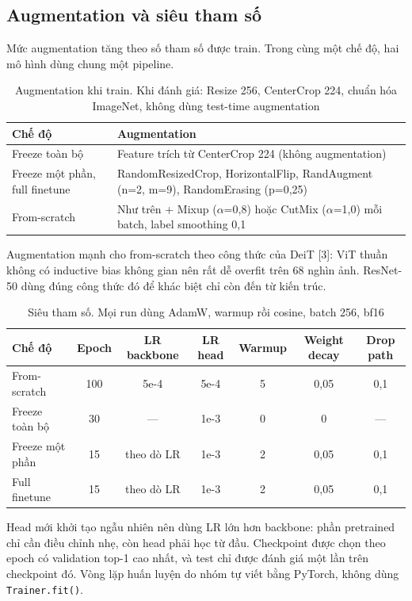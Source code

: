 \documentclass[12pt,a4paper]{article}
\begin{document}
\subsection{Augmentation và siêu tham số}

Mức augmentation tăng theo số tham số được train. Trong cùng một chế độ, hai mô hình
dùng chung một pipeline.

\begin{table}[H]
\centering
\caption{Augmentation khi train. Khi đánh giá: Resize 256, CenterCrop 224, chuẩn hóa
ImageNet, không dùng test-time augmentation}
\begin{tabular}{p{4.3cm}p{10.7cm}}
\toprule
Chế độ & Augmentation \\
\midrule
Freeze toàn bộ & Feature trích từ CenterCrop 224 (không augmentation) \\
Freeze một phần, full finetune & RandomResizedCrop, HorizontalFlip, RandAugment (n=2, m=9),
RandomErasing (p=0,25) \\
From-scratch & Như trên + Mixup ($\alpha$=0,8) hoặc CutMix ($\alpha$=1,0) mỗi batch,
label smoothing 0,1 \\
\bottomrule
\end{tabular}
\end{table}

Augmentation mạnh cho from-scratch theo công thức của DeiT [3]: ViT thuần không có
inductive bias không gian nên rất dễ overfit trên 68 nghìn ảnh. ResNet-50 dùng đúng
công thức đó để khác biệt chỉ còn đến từ kiến trúc.

\begin{table}[H]
\centering
\caption{Siêu tham số. Mọi run dùng AdamW, warmup rồi cosine, batch 256, bf16}
\label{tab:hparams}
\begin{tabular}{lcccccc}
\toprule
Chế độ & Epoch & LR backbone & LR head & Warmup & Weight decay & Drop path \\
\midrule
From-scratch & 100 & 5e-4 & 5e-4 & 5 & 0,05 & 0,1 \\
Freeze toàn bộ & 30 & --- & 1e-3 & 0 & 0 & --- \\
Freeze một phần & 15 & theo dò LR & 1e-3 & 2 & 0,05 & 0,1 \\
Full finetune & 15 & theo dò LR & 1e-3 & 2 & 0,05 & 0,1 \\
\bottomrule
\end{tabular}
\end{table}

Head mới khởi tạo ngẫu nhiên nên dùng LR lớn hơn backbone: phần pretrained chỉ cần
điều chỉnh nhẹ, còn head phải học từ đầu. Checkpoint được chọn theo epoch có
validation top-1 cao nhất, và test chỉ được đánh giá một lần trên checkpoint đó.
Vòng lặp huấn luyện do nhóm tự viết bằng PyTorch, không dùng \texttt{Trainer.fit()}.
\end{document}
